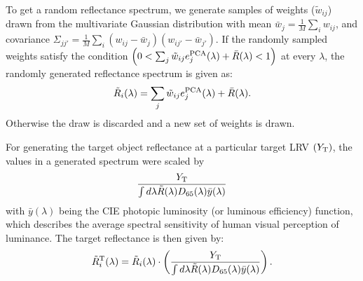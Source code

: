 \documentclass[10pt,english]{article}
\begin{document}
To get a random reflectance spectrum, we generate samples of weights ($\tilde{w}_{ij}$) drawn from the multivariate Gaussian 
distribution with mean $\bar{w}_j = \frac{1}{M}\sum_i w_{ij}$, 
and covariance $\Sigma_{jj'} = \frac{1}{M} \sum_i \left(w_{ij} -\bar{w}_j\right)\left(w_{ij'} -\bar{w}_{j'}\right) $. 
If the randomly sampled weights satisfy the condition $\left( 0 < \sum_j \tilde{w}_{ij}e_j^{\rm PCA}(\lambda) + \bar{R}(\lambda)<1\right) $ at every $\lambda$, the randomly generated reflectance spectrum is given as: 
\begin{align}
\tilde{R}_i(\lambda) =\sum_j \tilde{w}_{ij}e_j^{\rm PCA}(\lambda) + \bar{R}(\lambda).
\end{align}
Otherwise the draw is discarded and a new set of weights is drawn.

For generating the target object reflectance at a particular target LRV $(Y_{\rm T})$, the values in a generated spectrum were 
scaled by 
\begin{align}
\frac{Y_{\rm T}}{\int d\lambda \tilde{R}(\lambda) D_{65}(\lambda) \bar{y}(\lambda)}
\end{align} 
with $\bar{y}(\lambda)$ being the CIE photopic luminosity (or luminous efficiency) function, which
describes the average spectral sensitivity of human visual 
perception of luminance. The target reflectance is then given by: 
\begin{align}
\tilde{R}^{\rm T}_i(\lambda) =\tilde{R}_i(\lambda) \cdot\left(\frac{Y_{\rm T}}{\int d\lambda \tilde{R}(\lambda) D_{65}(\lambda) \bar{y}(\lambda)}\right).
\end{align}





\end{document}
